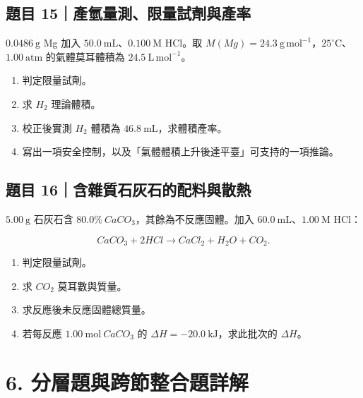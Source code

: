 \documentclass[11pt,a4paper]{article}
\providecommand{\tightlist}{%
  \setlength{\itemsep}{0pt}\setlength{\parskip}{0pt}}
\begin{document}
\subsection{題目 15｜產氫量測、限量試劑與產率}\label{ux984cux76ee-15ux7522ux6c2bux91cfux6e2cux9650ux91cfux8a66ux5291ux8207ux7522ux7387}

\(0.0486\ \mathrm g\) Mg 加入 \(50.0\ \mathrm{mL}\)、\(0.100\ \mathrm M\) HCl。取 \(M(Mg)=24.3\ \mathrm{g\,mol^{-1}}\)，\(25^\circ\mathrm C\)、\(1.00\ \mathrm{atm}\) 的氣體莫耳體積為 \(24.5\ \mathrm{L\,mol^{-1}}\)。

\begin{enumerate}
\def\labelenumi{\arabic{enumi}.}
\tightlist
\item
  判定限量試劑。
\item
  求 \(H_2\) 理論體積。
\item
  校正後實測 \(H_2\) 體積為 \(46.8\ \mathrm{mL}\)，求體積產率。
\item
  寫出一項安全控制，以及「氣體體積上升後達平臺」可支持的一項推論。
\end{enumerate}

\subsection{題目 16｜含雜質石灰石的配料與散熱}\label{ux984cux76ee-16ux542bux96dcux8ceaux77f3ux7070ux77f3ux7684ux914dux6599ux8207ux6563ux71b1}

\(5.00\ \mathrm g\) 石灰石含 \(80.0\%\ CaCO_3\)，其餘為不反應固體。加入 \(60.0\ \mathrm{mL}\)、\(1.00\ \mathrm M\) HCl：

\[
CaCO_3+2HCl\rightarrow CaCl_2+H_2O+CO_2.
\]

\begin{enumerate}
\def\labelenumi{\arabic{enumi}.}
\tightlist
\item
  判定限量試劑。
\item
  求 \(CO_2\) 莫耳數與質量。
\item
  求反應後未反應固體總質量。
\item
  若每反應 \(1.00\ \mathrm{mol}\ CaCO_3\) 的 \(\Delta H=-20.0\ \mathrm{kJ}\)，求此批次的 \(\Delta H\)。
\end{enumerate}

\section{6. 分層題與跨節整合題詳解}\label{ux5206ux5c64ux984cux8207ux8de8ux7bc0ux6574ux5408ux984cux8a73ux89e3}
\end{document}
